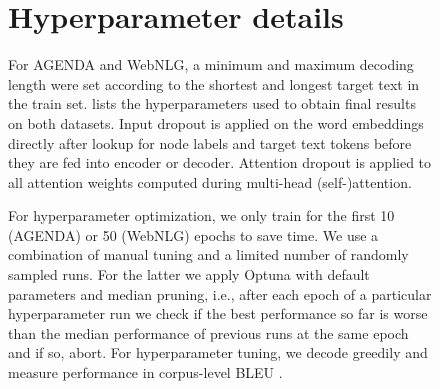\documentclass[11pt]{article}
\begin{document}
\begin{figure}
\begin{tabular}



\appendix
\section{Hyperparameter details}
\label{app:hyperparam}

For AGENDA and WebNLG, a minimum and maximum decoding length were set according to the shortest and longest target text in the train set.
 lists the hyperparameters used to obtain final results on both datasets.
Input dropout is applied on the word embeddings directly after lookup for node labels and target text tokens
before they are fed into encoder or decoder.
Attention dropout is applied to all attention weights computed during multi-head (self-)attention.

For hyperparameter optimization,
we only train for the first 10 (AGENDA) or 50 (WebNLG) epochs to save time.
We use a combination of manual tuning and a limited number of randomly sampled runs.
For the latter we apply Optuna with default parameters \citep{optuna19,bergstra11} and median pruning, 
i.e., after each epoch of a particular hyperparameter run
we check if the best performance so far is worse
than the median performance of previous runs at the same epoch
and if so, abort.
For hyperparameter tuning, we decode greedily and measure performance in corpus-level BLEU \citep{papineni-etal-2002-bleu}.


\end{tabular}
\end{figure}
\end{document}
